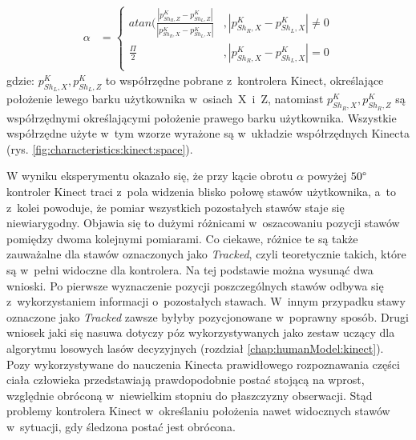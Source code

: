 \begin{equation}
	\label{eq:characteristics:kinect:bodyRotationAngle}
	\begin{split}
		\alpha &= 
		\begin{cases} 
			atan(\frac{|p^K_{{Sh}_R,Z} - p^K_{{Sh}_L,Z}|}{|p^K_{{Sh}_R,X} - p^K_{{Sh}_L,X}|} & , |p^K_{{Sh}_R,X} - p^K_{{Sh}_L,X}| \neq 0 \\
			\frac{\Pi}{2}                                                                    & , |p^K_{{Sh}_R,X} - p^K_{{Sh}_L,X}| = 0    \\		
		\end{cases}
	\end{split}
\end{equation}
gdzie: $p^K_{{Sh}_L,X}, p^K_{{Sh}_L,Z}$ to współrzędne pobrane z~kontrolera Kinect, określające położenie lewego barku użytkownika w~osiach~X~i~Z, natomiast $	p^K_{{Sh}_R,X}, p^K_{{Sh}_R,Z}$	są współrzędnymi określającymi położenie prawego barku użytkownika. Wszystkie współrzędne użyte w~tym wzorze wyrażone są w~układzie współrzędnych Kinecta (rys. \ref{fig:characteristics:kinect:space}).																																			
																																					
W wyniku eksperymentu okazało się, że przy kącie obrotu $\alpha$ powyżej $50\degree$ kontroler Kinect traci z~pola widzenia blisko połowę stawów użytkownika, a~to z~kolei powoduje, że pomiar wszystkich pozostałych stawów staje się niewiarygodny. Objawia się to dużymi różnicami w~oszacowaniu pozycji stawów pomiędzy dwoma kolejnymi pomiarami. Co ciekawe, różnice te są także zauważalne dla stawów oznaczonych jako \emph{Tracked}, czyli teoretycznie takich, które są w~pełni widoczne dla kontrolera. Na tej podstawie można wysunąć dwa wnioski. Po pierwsze wyznaczenie pozycji poszczególnych stawów odbywa się z~wykorzystaniem informacji o~pozostałych stawach. W~innym przypadku stawy oznaczone jako \emph{Tracked} zawsze byłyby pozycjonowane w~poprawny sposób. Drugi wniosek jaki się nasuwa dotyczy póz wykorzystywanych jako zestaw uczący dla algorytmu losowych lasów decyzyjnych (rozdział \ref{chap:humanModel:kinect}). Pozy wykorzystywane do nauczenia Kinecta prawidłowego rozpoznawania części ciała człowieka przedstawiają prawdopodobnie postać stojącą na wprost, względnie obróconą w~niewielkim stopniu do płaszczyzny obserwacji. Stąd problemy kontrolera Kinect w~określaniu położenia nawet widocznych stawów w~sytuacji, gdy śledzona postać jest obrócona.
																																					
